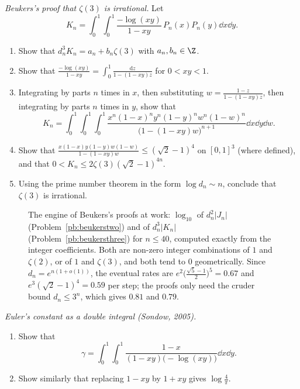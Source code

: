 \begin{exercise}[Journey]\label{pb:beukersthree}
\emph{Beukers's proof that $\zeta(3)$ is irrational.} Let
\[
K_n=\int_0^1\!\!\int_0^1\frac{-\log(xy)}{1-xy}\,P_n(x)P_n(y)\dd x\dd y.
\]
\begin{enumerate}[label=(\alph*)]
\item Show that $d_n^3K_n=a_n+b_n\zeta(3)$ with $a_n,b_n\in\Z$.
\item Show that $\frac{-\log(xy)}{1-xy}=\int_0^1\frac{\mathrm dz}{1-(1-xy)z}$ for $0<xy<1$.
\item Integrating by parts $n$ times in $x$, then substituting $w=\frac{1-z}{1-(1-xy)z}$, then integrating by parts $n$ times in $y$, show that
\[
K_n=\int_0^1\!\!\int_0^1\!\!\int_0^1\frac{x^n(1-x)^ny^n(1-y)^nw^n(1-w)^n}{\bigl(1-(1-xy)w\bigr)^{n+1}}\dd x\dd y\dd w.
\]
\item Show that $\frac{x(1-x)y(1-y)w(1-w)}{1-(1-xy)w}\le(\sqrt2-1)^4$ on $[0,1]^3$ (where defined), and that $0<K_n\le2\zeta(3)(\sqrt2-1)^{4n}$.
\item Using the prime number theorem in the form $\log d_n\sim n$, conclude that $\zeta(3)$ is irrational.
\end{enumerate}
\end{exercise}

\begin{figure}[ht]
\centering
{}
\caption{The engine of Beukers's proofs at work: $\log_{10}$ of $d_n^2|J_n|$ (Problem~\ref{pb:beukerstwo}) and of $d_n^3|K_n|$
(Problem~\ref{pb:beukersthree}) for $n\le40$, computed exactly from the integer coefficients. Both are non-zero integer combinations of
$1$ and $\zeta(2)$, or of $1$ and $\zeta(3)$, and both tend to $0$ geometrically. Since $d_n=e^{n(1+o(1))}$, the eventual rates are $e^2\bigl(\frac{\sqrt5-1}2\bigr)^5=0.67$ and
$e^3(\sqrt2-1)^4=0.59$ per step; the proofs only need the cruder bound $d_n\le3^n$, which gives $0.81$ and $0.79$.}
\label{fig:beukers}
\end{figure}

\begin{exercise}[$\star\star$]\label{pb:sondow}
\emph{Euler's constant as a double integral (Sondow, 2005).}
\begin{enumerate}[label=(\alph*)]
\item Show that
\[
\gamma=\int_0^1\!\!\int_0^1\frac{1-x}{(1-xy)\bigl(-\log(xy)\bigr)}\dd x\dd y.
\]
\item Show similarly that replacing $1-xy$ by $1+xy$ gives $\log\frac4\pi$.
\end{enumerate}
\end{exercise}

